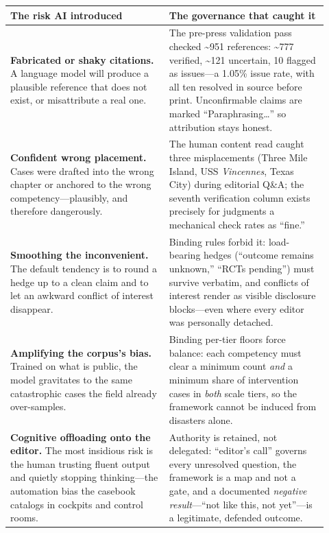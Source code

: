 \documentclass[11pt]{article}
\begin{document}
\begin{softbox}
\renewcommand{\arraystretch}{1.25}
\begin{tabular}{@{}p{0.46\linewidth}@{\hspace{1.1em}}p{0.46\linewidth}@{}}
\textbf{\color{lenswarn}The risk AI introduced} & \textbf{\color{lensgood}The governance that caught it}\\[0.3em]
\hline
\rule{0pt}{1.4em}%
\textbf{Fabricated or shaky citations.} A language model will produce a plausible reference that does not exist, or misattribute a real one. &
The pre-press validation pass checked \textasciitilde951 references: \textasciitilde777 verified, \textasciitilde121 uncertain, 10 flagged as issues---a 1.05\% issue rate, with all ten resolved in source before print. Unconfirmable claims are marked ``Paraphrasing\ldots'' so attribution stays honest.\\[0.5em]
\textbf{Confident wrong placement.} Cases were drafted into the wrong chapter or anchored to the wrong competency---plausibly, and therefore dangerously. &
The human content read caught three misplacements (Three Mile Island, USS \emph{Vincennes}, Texas City) during editorial Q\&A; the seventh verification column exists precisely for judgments a mechanical check rates as ``fine.''\\[0.5em]
\textbf{Smoothing the inconvenient.} The default tendency is to round a hedge up to a clean claim and to let an awkward conflict of interest disappear. &
Binding rules forbid it: load-bearing hedges (``outcome remains unknown,'' ``RCTs pending'') must survive verbatim, and conflicts of interest render as visible disclosure blocks---even where every editor was personally detached.\\[0.5em]
\textbf{Amplifying the corpus's bias.} Trained on what is public, the model gravitates to the same catastrophic cases the field already over-samples. &
Binding per-tier floors force balance: each competency must clear a minimum count \emph{and} a minimum share of intervention cases in \emph{both} scale tiers, so the framework cannot be induced from disasters alone.\\[0.5em]
\textbf{Cognitive offloading onto the editor.} The most insidious risk is the human trusting fluent output and quietly stopping thinking---the automation bias the casebook catalogs in cockpits and control rooms. &
Authority is retained, not delegated: ``editor's call'' governs every unresolved question, the framework is a map and not a gate, and a documented \emph{negative result}---``not like this, not yet''---is a legitimate, defended outcome.\\
\end{tabular}
\end{softbox}
\end{document}
